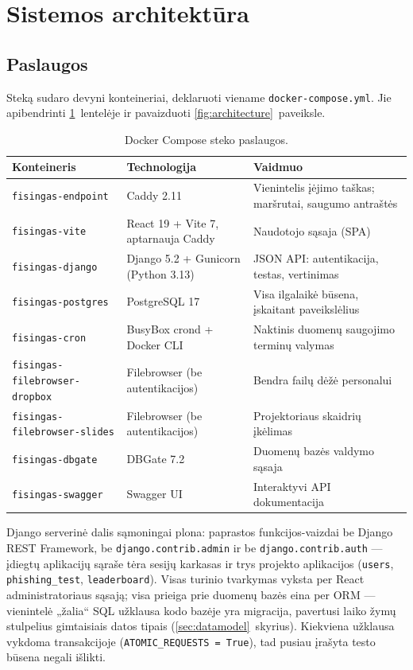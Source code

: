 \documentclass[11pt,a4paper]{article}
\newcommand{\code}[1]{\texttt{#1}}
\begin{document}
\section{Sistemos architektūra}
\label{sec:architecture}

\subsection{Paslaugos}

Steką sudaro devyni konteineriai, deklaruoti viename
\code{docker-compose.yml}. Jie apibendrinti
\ref{tab:services}~lentelėje ir pavaizduoti
\ref{fig:architecture}~paveiksle.

\begin{table}[h]
\centering
\small
\begin{tabular}{@{}lll@{}}
\toprule
\textbf{Konteineris} & \textbf{Technologija} & \textbf{Vaidmuo} \\
\midrule
\code{fisingas-endpoint} & Caddy 2.11 & Vienintelis įėjimo taškas; maršrutai, saugumo antraštės \\
\code{fisingas-vite}     & React 19 + Vite 7, aptarnauja Caddy & Naudotojo sąsaja (SPA) \\
\code{fisingas-django}   & Django 5.2 + Gunicorn (Python 3.13) & JSON API: autentikacija, testas, vertinimas \\
\code{fisingas-postgres} & PostgreSQL 17 & Visa ilgalaikė būsena, įskaitant paveikslėlius \\
\code{fisingas-cron}     & BusyBox crond + Docker CLI & Naktinis duomenų saugojimo terminų valymas \\
\code{fisingas-filebrowser-dropbox} & Filebrowser (be autentikacijos) & Bendra failų dėžė personalui \\
\code{fisingas-filebrowser-slides}  & Filebrowser (be autentikacijos) & Projektoriaus skaidrių įkėlimas \\
\code{fisingas-dbgate}   & DBGate 7.2 & Duomenų bazės valdymo sąsaja \\
\code{fisingas-swagger}  & Swagger UI & Interaktyvi API dokumentacija \\
\bottomrule
\end{tabular}
\caption{Docker Compose steko paslaugos.}
\label{tab:services}
\end{table}

Django serverinė dalis sąmoningai plona: paprastos funkcijos-vaizdai
be Django REST Framework, be \code{django.contrib.admin} ir be
\code{django.contrib.auth} — įdiegtų aplikacijų sąraše tėra sesijų
karkasas ir trys projekto aplikacijos (\code{users},
\code{phishing\_test}, \code{leaderboard}). Visas turinio tvarkymas
vyksta per React administratoriaus sąsają; visa prieiga prie duomenų
bazės eina per ORM — vienintelė „žalia`` SQL užklausa kodo bazėje
yra migracija, pavertusi laiko žymų stulpelius gimtaisiais datos
tipais (\ref{sec:datamodel}~skyrius). Kiekviena užklausa vykdoma
transakcijoje
(\code{ATOMIC\_REQUESTS = True}), tad pusiau įrašyta testo būsena
negali išlikti.
\end{document}
